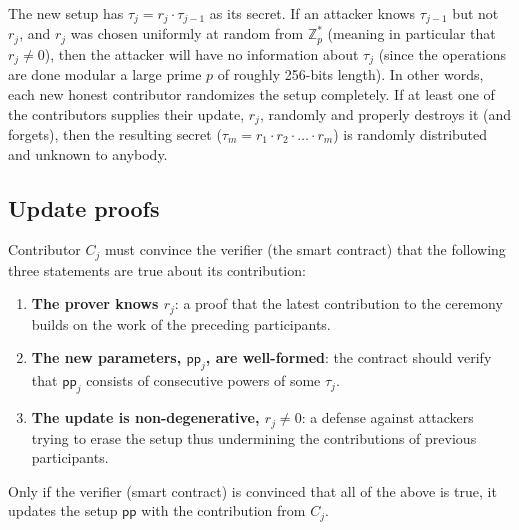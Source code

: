 \documentclass{article}
\newcommand{\pp}{\mathsf{pp}}
\begin{document}

The new setup has $\tau_j = r_j \cdot \tau_{j-1}$ as its secret. If an attacker knows $\tau_{j-1}$ but not $r_j$, and $r_j$ was chosen uniformly at random from $\mathbb{Z}^*_p$ (meaning in particular that $r_j \neq 0$), then the attacker will have no information about $\tau_j$ (since the operations are done modular a large prime $p$ of roughly 256-bits length).
In other words, each new honest contributor randomizes the setup completely.
If at least one of the contributors supplies their update, $r_j$, randomly and properly destroys it (and forgets), then the resulting secret ($\tau_m = r_1\cdot r_2 \cdot \ldots \cdot r_m$) is randomly distributed and unknown to anybody.

\subsection{Update proofs}

Contributor $C_j$ must convince the verifier (the smart contract) that the following three statements are true about its contribution:
\begin{enumerate}
    \item \textbf{The prover knows $r_j$}: a proof that the latest contribution to the ceremony builds on the work of the preceding participants. %
    \item \textbf{The new parameters, $\pp_j$, are well-formed}: the contract should verify that $\pp_j$ consists of consecutive powers of some $\tau_j$.
    \item \textbf{The update is non-degenerative, $r_j \neq 0$}: a defense against attackers trying to erase the setup thus undermining the contributions of previous participants.
\end{enumerate}
Only if the verifier (smart contract) is convinced that all of the above is true, it updates the setup $\pp$ with the contribution from $C_j$.\\
\end{document}
